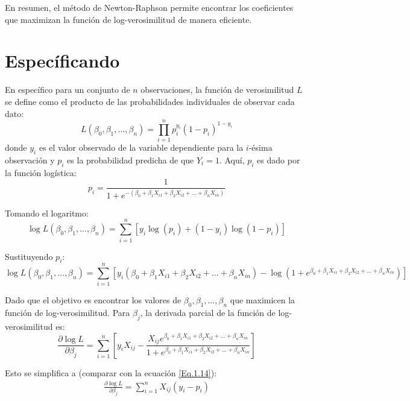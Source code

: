 En resumen, el método de Newton-Raphson permite encontrar los coeficientes que maximizan la función de log-verosimilitud de manera eficiente. 

\section{Espec\'ificando}
En espec\'ifico para un conjunto de $n$ observaciones, la función de verosimilitud $L$ se define como el producto de las probabilidades individuales de observar cada dato:
\begin{equation}
L(\beta_0, \beta_1, \ldots, \beta_n) = \prod_{i=1}^{n} p_i^{y_i} (1 - p_i)^{1 - y_i}
\end{equation}
donde $y_i$ es el valor observado de la variable dependiente para la $i$-ésima observación y $p_i$ es la probabilidad predicha de que $Y_i = 1$. Aquí, $p_i$ es dado por la función logística:
\begin{equation}
p_i = \frac{1}{1 + e^{-(\beta_0 + \beta_1 X_{i1} + \beta_2 X_{i2} + \ldots + \beta_n X_{in})}}
\end{equation}

Tomando el logaritmo:
\begin{equation}
\log L(\beta_0, \beta_1, \ldots, \beta_n) = \sum_{i=1}^{n} \left[ y_i \log(p_i) + (1 - y_i) \log(1 - p_i) \right]
\end{equation}

Sustituyendo $p_i$:
\begin{equation}
\log L(\beta_0, \beta_1, \ldots, \beta_n) = \sum_{i=1}^{n} \left[ y_i (\beta_0 + \beta_1 X_{i1} + \beta_2 X_{i2} + \ldots + \beta_n X_{in}) - \log(1 + e^{\beta_0 + \beta_1 X_{i1} + \beta_2 X_{i2} + \ldots + \beta_n X_{in}}) \right]
\end{equation}

Dado que el objetivo es encontrar los valores de $\beta_0, \beta_1, \ldots, \beta_n$ que maximicen la función de log-verosimilitud.  Para $\beta_j$, la derivada parcial de la función de log-verosimilitud es:
\begin{equation}
\frac{\partial \log L}{\partial \beta_j} = \sum_{i=1}^{n} \left[ y_i X_{ij} - \frac{X_{ij} e^{\beta_0 + \beta_1 X_{i1} + \beta_2 X_{i2} + \ldots + \beta_n X_{in}}}{1 + e^{\beta_0 + \beta_1 X_{i1} + \beta_2 X_{i2} + \ldots + \beta_n X_{in}}} \right]
\end{equation}

Esto se simplifica a (comparar con la ecuaci\'on \ref{Eq.1.14}):
\begin{eqnarray}\label{Eq.1.25}
\frac{\partial \log L}{\partial \beta_j} = \sum_{i=1}^{n} X_{ij} (y_i - p_i)
\end{eqnarray}


